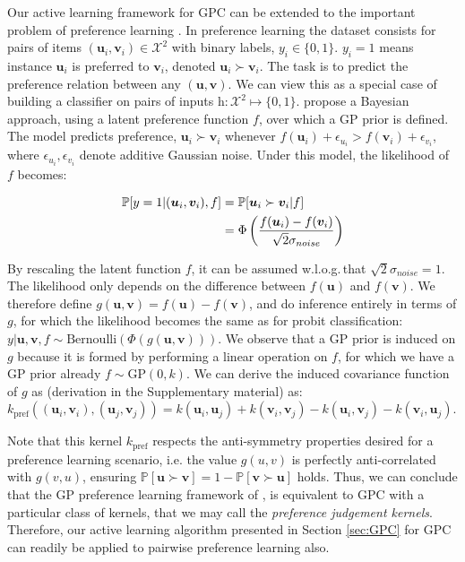\documentclass[twoside]{article}
\newcommand{\upref}{\bm{u}}
\newcommand{\vpref}{\bm{v}}
\newcommand{\rmh}{\mathrm{h}}
\begin{document}
Our active learning framework for GPC can be extended to the important problem of preference learning \cite{furnkranz2003, chu2005}. In preference learning the dataset consists for pairs of items $(\upref_i,\vpref_i)\in\mathcal{X}^2$ with binary labels, $y_i\in\{0,1\}$. $y_i=1$ means instance $\upref_i$ is preferred to $\vpref_i$, denoted $\upref_i\succ \vpref_i$. The task is to predict the preference relation between any $(\upref,\vpref)$. We can view this as a special case of building a classifier on pairs of inputs $\rmh:\mathcal{X}^2\mapsto\{0,1\}$. \cite{chu2005} propose a Bayesian approach, using a latent preference function $f$, over which a GP prior is defined. The model predicts preference,  $\upref_i \succ \vpref_i$ whenever $f(\upref_i)+\epsilon_{u_i}>f(\vpref_i)+\epsilon_{v_i}$, where $\epsilon_{u_i}, \epsilon_{v_i}$ denote additive Gaussian noise. Under this model, the likelihood of $f$ becomes:

\begin{align}
	\mathbb{P}[y=1\vert (\upref_i,\vpref_i), f] &= \mathbb{P}[\upref_i\succ \vpref_i \vert f] \notag\\
	&=  \Phi\left(\frac{f(\upref_i) - f(\vpref_i)}{\sqrt{2}\sigma_{noise}}\right)
\end{align}

By rescaling the latent function $f$, it can be assumed w.l.o.g.\,that $\sqrt{2}\sigma_{noise}=1$. The likelihood only depends on the difference between $f(\upref)$ and $f(\vpref)$. We therefore define $g(\upref,\vpref)=f(\upref)-f(\vpref)$, and do inference entirely in terms of $g$, for which the likelihood becomes the same as for probit classification: $y|\upref,\vpref,f\sim \mathrm{Bernoulli}(\Phi(g(\upref,\vpref)))$. We observe that a GP prior is induced on $g$ because it is formed by performing a linear operation on $f$, for which we have a GP prior already $f\sim \mathrm{GP}(0,k)$. We can derive the induced covariance function of $g$ as (derivation in the Supplementary material) as: $k_{\mathrm{pref}}((\upref_i,\vpref_i),(\upref_j,\vpref_j)) = k(\upref_i,\upref_j) + k(\vpref_i,\vpref_j) - k(\upref_i,\vpref_j) - k(\vpref_i,\upref_j)$.


Note that this kernel $k_{\mathrm{pref}}$ respects the anti-symmetry properties desired for a preference learning scenario, i.e. the value $g(u,v)$ is perfectly anti-correlated with $g(v,u)$, ensuring $\mathbb{P}[\upref\succ \vpref] = 1 - \mathbb{P}[\vpref \succ \upref]$ holds. Thus, we can conclude that the GP preference learning framework of \cite{chu2005}, is equivalent to GPC with a particular class of kernels, that we may call the \emph{preference judgement kernels}. Therefore, our active learning algorithm presented in Section \ref{sec:GPC} for GPC can readily be applied to pairwise preference learning also.
\end{document}
